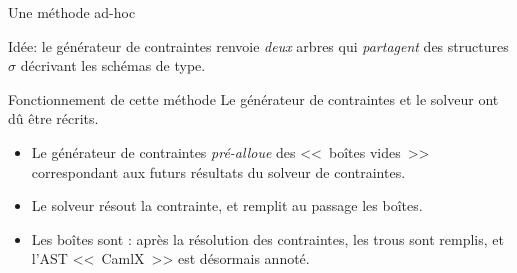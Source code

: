 \documentclass[final]{beamer}
\newcommand{\red}[1]{\textcolor[HTML]{F7800A}{#1}}
\begin{document}
\newcommand{\redsigma}{\ensuremath{\red{\boldsymbol\sigma}}}

\begin{frame}{Une méthode ad-hoc}
  \begin{center}
    \footnotesize
  \end{center}
  Idée: le générateur de contraintes renvoie \emph{deux} arbres qui
  \emph{\red{partagent}} des structures $\sigma$ décrivant les schémas de type.
\end{frame}

\begin{frame}{Fonctionnement de cette méthode}
  Le générateur de contraintes et le solveur ont dû être récrits.
  \begin{itemize}
    \item Le générateur de contraintes \emph{pré-alloue} des <<~boîtes vides~>>
      correspondant aux futurs résultats du solveur de contraintes.
    \item Le solveur résout la contrainte, et remplit au passage les boîtes.
    \item Les boîtes sont \underline{}: après la résolution des
      contraintes, les trous sont remplis, et l'AST <<~CamlX~>> est désormais annoté.
  \end{itemize}
\end{frame}
\end{document}
